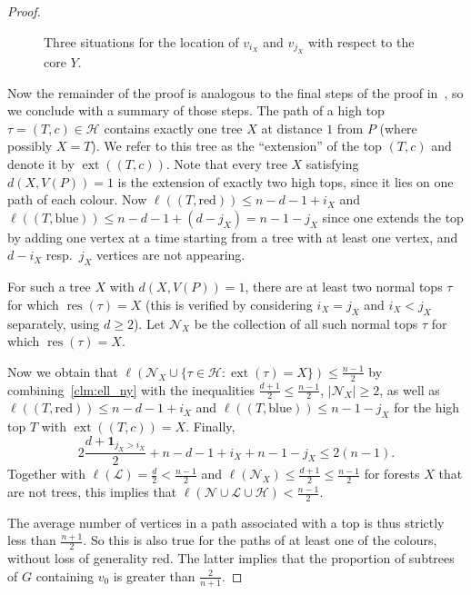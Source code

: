 \documentclass[11pt]{article}
\theoremstyle{definition}
\newcommand{\res}{\operatorname{res}}
\newcommand{\ext}{\operatorname{ext}}
\newcommand{\nx}{\mathcal N_{X}}
\newcommand*{\abs}[1]{\lvert #1\rvert}
\begin{document}
\begin{proof}
\begin{figure}[ht]


    
    \caption{Three situations for the location of $v_{i_X}$ and $v_{j_X}$ with respect to the core $Y$.}%
    \label{fig:3sit}
\end{figure}

    Now the remainder of the proof is analogous to the final steps of the proof in~\cite{John22}, so we conclude with a summary of those steps.
    The path of a high top $\tau=(T,c)\in \mathcal H$ contains exactly one tree $X$ at distance $1$ from $P$ (where possibly $X=T$).
    We refer to this tree as the ``extension'' of the top $(T,c)$ and denote it by $\ext((T,c))$. Note that every tree $X$ satisfying $d(X,V(P))=1$ is the extension of exactly two high tops, since it lies on one path of each colour.
    Now $\ell((T,\text{red}))\le n-d-1+i_X$ and $\ell((T,\text{blue}))\le n-d-1+(d-j_X)=n-1-j_X$ since one extends the top by adding one vertex at a time starting from a tree with at least one vertex, and $d-i_X$ resp.~$j_X$ vertices are not appearing.
    
    For such a tree $X$ with $d(X,V(P))=1$, there are at least two normal tops $\tau$ for which $\res(\tau)=X$
    (this is verified by considering $i_X=j_X$ and $i_X<j_X$ separately, using $d \ge 2$).
    Let $\nx$ be the collection of all such normal tops $\tau$ for which $\res(\tau)=X$.

    Now we obtain that $\ell\left( \nx \cup\{\tau\in\mathcal H:\ext(\tau)=X\} \right) \le \frac{n-1}{2}$ by combining~\cref{clm:ell_ny} with the inequalities 
    $\frac{d+1}{2} \le \frac{n-1}{2}$, $\abs{\nx} \ge 2$, as well as $\ell((T,\text{red}))\le n-d-1+i_X$ and $\ell((T,\text{blue}))\le n-1-j_X$ for the high top $T$ with $\ext((T,c))=X$. Finally,
    $$2\frac {d+ \mathbf{1}_{j_X>i_X}}2 + n-d-1+i_X + n-1-j_X \le 2(n-1).$$
    Together with $\ell(\mathcal L) =\frac d2 < \frac{n-1}{2}$ and $\ell(\nx) \le \frac{d+1}{2} \le \frac{n-1}{2}$ for forests $X$ that are not trees, this implies that $\ell(\mathcal N \cup \mathcal L \cup \mathcal H) < \frac{n-1}{2}.$
   
    
    The average number of vertices in a path associated with a top is thus strictly less than $\frac{n+1}{2}$. So this is also true for the paths of at least one of the colours, without loss of generality red.
    The latter implies that the proportion of subtrees of $G$ containing $v_0$ is greater than $\frac{2}{n+1}.$    
\end{proof}
\end{document}
